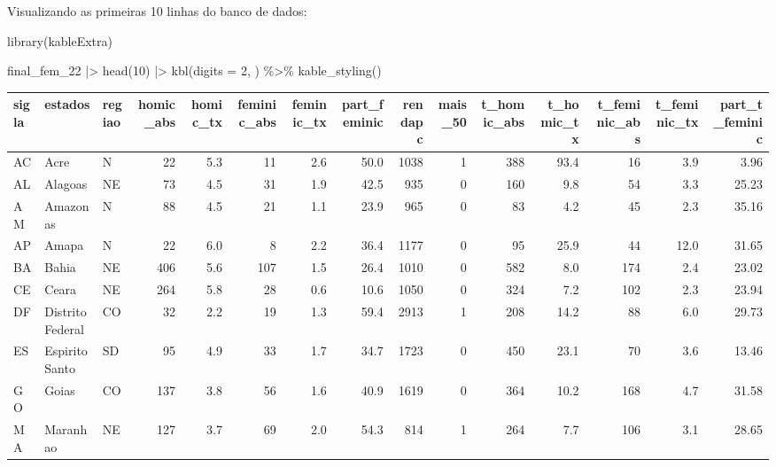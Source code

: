 \documentclass[
  letterpaper,
  DIV=11,
  numbers=noendperiod]{scrreprt}
\newenvironment{Shaded}{\begin{snugshade}}{\end{snugshade}}
\newcommand{\AttributeTok}[1]{\textcolor[rgb]{0.40,0.45,0.13}{#1}}
\newcommand{\DecValTok}[1]{\textcolor[rgb]{0.68,0.00,0.00}{#1}}
\newcommand{\FunctionTok}[1]{\textcolor[rgb]{0.28,0.35,0.67}{#1}}
\newcommand{\NormalTok}[1]{\textcolor[rgb]{0.00,0.23,0.31}{#1}}
\newcommand{\SpecialCharTok}[1]{\textcolor[rgb]{0.37,0.37,0.37}{#1}}
\begin{document}
Visualizando as primeiras 10 linhas do banco de dados:

\begin{Shaded}
\begin{Highlighting}[]
\FunctionTok{library}\NormalTok{(kableExtra)}

\NormalTok{final\_fem\_22 }\SpecialCharTok{|\textgreater{}} 
  \FunctionTok{head}\NormalTok{(}\DecValTok{10}\NormalTok{) }\SpecialCharTok{|\textgreater{}} 
  \FunctionTok{kbl}\NormalTok{(}\AttributeTok{digits =} \DecValTok{2}\NormalTok{,  ) }\SpecialCharTok{\%\textgreater{}\%}
     \FunctionTok{kable\_styling}\NormalTok{()}
\end{Highlighting}
\end{Shaded}

\begin{table}
\centering
\begin{tabular}[t]{l|l|l|r|r|r|r|r|r|r|r|r|r|r|r}
\hline
sigla & estados & regiao & homic\_abs & homic\_tx & feminic\_abs & feminic\_tx & part\_feminic & rendapc & mais\_50 & t\_homic\_abs & t\_homic\_tx & t\_feminic\_abs & t\_feminic\_tx & part\_t\_feminic\\
\hline
AC & Acre & N & 22 & 5.3 & 11 & 2.6 & 50.0 & 1038 & 1 & 388 & 93.4 & 16 & 3.9 & 3.96\\
\hline
AL & Alagoas & NE & 73 & 4.5 & 31 & 1.9 & 42.5 & 935 & 0 & 160 & 9.8 & 54 & 3.3 & 25.23\\
\hline
AM & Amazonas & N & 88 & 4.5 & 21 & 1.1 & 23.9 & 965 & 0 & 83 & 4.2 & 45 & 2.3 & 35.16\\
\hline
AP & Amapa & N & 22 & 6.0 & 8 & 2.2 & 36.4 & 1177 & 0 & 95 & 25.9 & 44 & 12.0 & 31.65\\
\hline
BA & Bahia & NE & 406 & 5.6 & 107 & 1.5 & 26.4 & 1010 & 0 & 582 & 8.0 & 174 & 2.4 & 23.02\\
\hline
CE & Ceara & NE & 264 & 5.8 & 28 & 0.6 & 10.6 & 1050 & 0 & 324 & 7.2 & 102 & 2.3 & 23.94\\
\hline
DF & Distrito Federal & CO & 32 & 2.2 & 19 & 1.3 & 59.4 & 2913 & 1 & 208 & 14.2 & 88 & 6.0 & 29.73\\
\hline
ES & Espirito Santo & SD & 95 & 4.9 & 33 & 1.7 & 34.7 & 1723 & 0 & 450 & 23.1 & 70 & 3.6 & 13.46\\
\hline
GO & Goias & CO & 137 & 3.8 & 56 & 1.6 & 40.9 & 1619 & 0 & 364 & 10.2 & 168 & 4.7 & 31.58\\
\hline
MA & Maranhao & NE & 127 & 3.7 & 69 & 2.0 & 54.3 & 814 & 1 & 264 & 7.7 & 106 & 3.1 & 28.65\\
\hline
\end{tabular}
\end{table}
\end{document}

